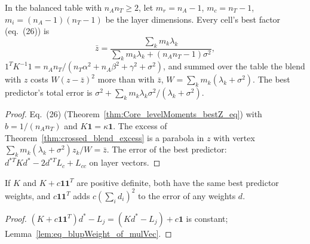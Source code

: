 \begin{theorem}\label{thm:crossed_bestZ}
  \leanok
  In the balanced table with $n_An_T \ge 2$, let $m_r = n_A - 1$, $m_c = n_T - 1$,
  $m_i = (n_A - 1)(n_T - 1)$ be the layer dimensions. Every cell's best factor (eq.~(26)) is
  \[
    \bar z = \frac{\sum_k m_k\lambda_k}{\sum_k m_k\lambda_k + (n_An_T - 1)\sigma^2},
  \]
  $1^TK^{-1}1 = n_An_T/(n_T\alpha^2 + n_A\beta^2 + \gamma^2 + \sigma^2)$, and summed over the table
  the blend with $z$ costs $W(z - \bar z)^2$ more than with $\bar z$,
  $W = \sum_k m_k(\lambda_k + \sigma^2)$. The best predictor's total error is
  $\sigma^2 + \sum_k m_k\lambda_k\sigma^2/(\lambda_k + \sigma^2)$.
\end{theorem}
\begin{proof}
  \leanok
  Eq.~(26) (Theorem~\ref{thm:Core_levelMoments_bestZ_eq}) with $b = 1/(n_An_T)$ and
  $K\mathbf 1 = \kappa\mathbf 1$. The excess of Theorem~\ref{thm:crossed_blend_excess} is a
  parabola in $z$ with vertex $\sum_k m_k(\lambda_k + \sigma^2)z_k/W = \bar z$. The error of the
  best predictor: $d^{*T}Kd^* - 2d^{*T}L_c + L_{cc}$ on layer vectors.
\end{proof}

\begin{lemma}\label{lem:Core_blupWeight_add_rankOne}
  \leanok
  If $K$ and $K + c\mathbf 1\mathbf 1^T$ are positive definite, both have the same best predictor
  weights, and $c\mathbf 1\mathbf 1^T$ adds $c(\sum_i d_i)^2$ to the error of any weights $d$.
\end{lemma}
\begin{proof}
  \leanok
  $(K + c\mathbf 1\mathbf 1^T)d^* - L_j = (Kd^* - L_j) + c\mathbf 1$ is constant;
  Lemma~\ref{lem:eq_blupWeight_of_mulVec}.
\end{proof}

